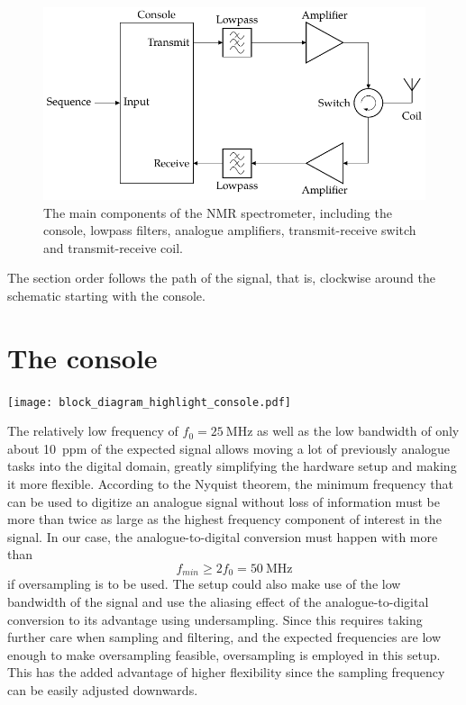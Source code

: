 \begin{figure}[hbt]
    \centering
    \includegraphics{images/block_diagram.pdf}
    \caption{ The main components of the \magnethical{} NMR spectrometer, including the console, lowpass filters, analogue amplifiers, transmit-receive switch and transmit-receive coil.}
\end{figure}

The section order follows the path of the signal, that is, clockwise around the schematic starting with the console.

\section{The console}
\begin{marginfigure}[-4.5\baselineskip]
    \texttt{[image: block\_diagram\_highlight\_console.pdf]}
\end{marginfigure}

The relatively low frequency of \(f_0 = \qty{25}{\mega\hertz}\) as well as the low bandwidth of only about \qty{10}{ppm} of the expected signal allows moving a lot of previously analogue tasks into the digital domain, greatly simplifying the hardware setup and making it more flexible. According to the Nyquist theorem, the minimum frequency that can be used to digitize an analogue signal without loss of information must be more than twice as large as the highest frequency component of interest in the signal. In our case, the analogue-to-digital conversion must happen with more than
\[
    f_{min} \ge 2f_0 = \qty{50}{\mega\hertz}
\]
if oversampling is to be used. The setup could also make use of the low bandwidth of the signal and use the aliasing effect of the analogue-to-digital conversion to its advantage using undersampling. Since this requires taking further care when sampling and filtering, and the expected frequencies are low enough to make oversampling feasible, oversampling is employed in this setup. This has the added advantage of higher flexibility since the sampling frequency can be easily adjusted downwards.

